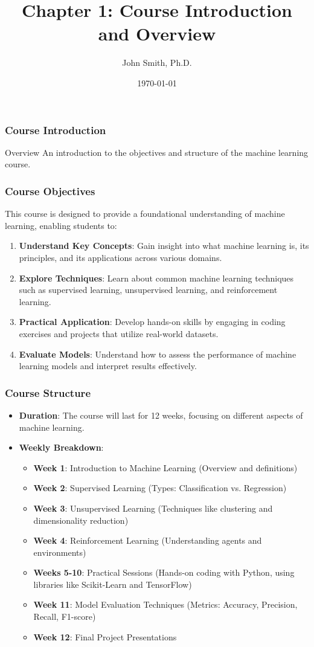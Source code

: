 \documentclass[aspectratio=169]{beamer}
\title[Course Introduction and Overview]{Chapter 1: Course Introduction and Overview}
\author[J. Smith]{John Smith, Ph.D.}
\institute[University Name]{
  Department of Computer Science\\
  University Name\\
  \vspace{0.3cm}
  Email: email@university.edu\\
  Website: www.university.edu
}
\date{\today}
\begin{document}
\frame{\titlepage}

\begin{frame}[fragile]
    \frametitle{Course Introduction}
    \begin{block}{Overview}
        An introduction to the objectives and structure of the machine learning course.
    \end{block}
\end{frame}

\begin{frame}[fragile]
    \frametitle{Course Objectives}
    This course is designed to provide a foundational understanding of machine learning, enabling students to:
    \begin{enumerate}
        \item \textbf{Understand Key Concepts}: Gain insight into what machine learning is, its principles, and its applications across various domains.
        \item \textbf{Explore Techniques}: Learn about common machine learning techniques such as supervised learning, unsupervised learning, and reinforcement learning.
        \item \textbf{Practical Application}: Develop hands-on skills by engaging in coding exercises and projects that utilize real-world datasets.
        \item \textbf{Evaluate Models}: Understand how to assess the performance of machine learning models and interpret results effectively.
    \end{enumerate}
\end{frame}

\begin{frame}[fragile]
    \frametitle{Course Structure}
    \begin{itemize}
        \item \textbf{Duration}: The course will last for 12 weeks, focusing on different aspects of machine learning.
        
        \item \textbf{Weekly Breakdown}:
        \begin{itemize}
            \item \textbf{Week 1}: Introduction to Machine Learning (Overview and definitions)
            \item \textbf{Week 2}: Supervised Learning (Types: Classification vs. Regression)
            \item \textbf{Week 3}: Unsupervised Learning (Techniques like clustering and dimensionality reduction)
            \item \textbf{Week 4}: Reinforcement Learning (Understanding agents and environments)
            \item \textbf{Weeks 5-10}: Practical Sessions (Hands-on coding with Python, using libraries like Scikit-Learn and TensorFlow)
            \item \textbf{Week 11}: Model Evaluation Techniques (Metrics: Accuracy, Precision, Recall, F1-score)
            \item \textbf{Week 12}: Final Project Presentations
        \end{itemize}
    \end{itemize}
\end{frame}
\end{document}
